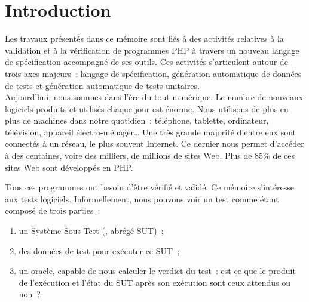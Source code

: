 \chapter{Introduction}
\label{chapter:introduction}

\minitoc

Les travaux présentés dans ce mémoire sont liés à des activités relatives à la
validation et à la vérification de programmes PHP à travers un nouveau langage
de spécification accompagné de ses outils. Ces activités s'articulent autour de
trois axes majeurs~: langage de spécification, génération automatique de données
de tests et génération automatique de tests unitaires. \\

Aujourd'hui, nous sommes dans l'ère du tout numérique. Le nombre de nouveaux
logiciels produits et utilisés chaque jour est énorme. Nous utilisons de plus en
plus de machines dans notre quotidien~: téléphone, tablette, ordinateur,
télévision, appareil électro-ménager… Une très grande majorité d'entre eux sont
connectés à un réseau, le plus souvent Internet. Ce dernier nous permet
d'accéder à des centaines, voire des milliers, de millions de sites Web. Plus de
85\% de ces sites Web sont développés en PHP.

Tous ces programmes ont besoin d'être vérifié et validé. Ce mémoire s'intéresse
aux tests logiciels. Informellement, nous pouvons voir un test comme étant
composé de trois parties~:

\begin{enumerate}

\item un Système Sous Test (, abrégé {\strong
SUT})~;

\item des {\strong données de test} pour exécuter ce SUT~;

\item un {\strong oracle}, capable de nous calculer le verdict du test~: est-ce
que le produit de l'exécution et l'état du SUT après son exécution sont ceux
attendus ou non~?

\end{enumerate}

